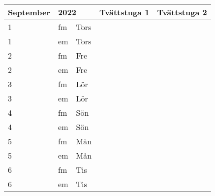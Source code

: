 \documentclass[a4paper]{article}
\begin{document}
\begin{table}[ht!]
\vspace{-10em}%
\normalsize
\begin{tabular}{lllp{7cm}p{7cm}}
\textbf{September}           & \multicolumn{2}{l}{\textbf{2022}}                  & \textbf{Tvättstuga 1} & \textbf{Tvättstuga 2} \\ \hline    

\multicolumn{1}{|l|}{1} & \multicolumn{1}{l|}{fm} & \multicolumn{1}{l|}{Tors} & \multicolumn{1}{l|}{} & \multicolumn{1}{l|}{} \\ \hline
\multicolumn{1}{|l|}{1} & \multicolumn{1}{l|}{em} & \multicolumn{1}{l|}{Tors} & \multicolumn{1}{l|}{} & \multicolumn{1}{l|}{} \\ \hline    

\multicolumn{1}{|l|}{2} & \multicolumn{1}{l|}{fm} & \multicolumn{1}{l|}{Fre} & \multicolumn{1}{l|}{} & \multicolumn{1}{l|}{} \\ \hline
\multicolumn{1}{|l|}{2} & \multicolumn{1}{l|}{em} & \multicolumn{1}{l|}{Fre} & \multicolumn{1}{l|}{} & \multicolumn{1}{l|}{} \\ \hline    

\multicolumn{1}{|l|}{3} & \multicolumn{1}{l|}{fm} & \multicolumn{1}{l|}{Lör} & \multicolumn{1}{l|}{} & \multicolumn{1}{l|}{} \\ \hline
\multicolumn{1}{|l|}{3} & \multicolumn{1}{l|}{em} & \multicolumn{1}{l|}{Lör} & \multicolumn{1}{l|}{} & \multicolumn{1}{l|}{} \\ \hline    

\multicolumn{1}{|l|}{4} & \multicolumn{1}{l|}{fm} & \multicolumn{1}{l|}{Sön} & \multicolumn{1}{l|}{} & \multicolumn{1}{l|}{} \\ \hline
\multicolumn{1}{|l|}{4} & \multicolumn{1}{l|}{em} & \multicolumn{1}{l|}{Sön} & \multicolumn{1}{l|}{} & \multicolumn{1}{l|}{} \\ \hline    

\multicolumn{1}{|l|}{5} & \multicolumn{1}{l|}{fm} & \multicolumn{1}{l|}{Mån} & \multicolumn{1}{l|}{} & \multicolumn{1}{l|}{} \\ \hline
\multicolumn{1}{|l|}{5} & \multicolumn{1}{l|}{em} & \multicolumn{1}{l|}{Mån} & \multicolumn{1}{l|}{} & \multicolumn{1}{l|}{} \\ \hline    

\multicolumn{1}{|l|}{6} & \multicolumn{1}{l|}{fm} & \multicolumn{1}{l|}{Tis} & \multicolumn{1}{l|}{} & \multicolumn{1}{l|}{} \\ \hline
\multicolumn{1}{|l|}{6} & \multicolumn{1}{l|}{em} & \multicolumn{1}{l|}{Tis} & \multicolumn{1}{l|}{} & \multicolumn{1}{l|}{} \\ \hline    


\end{tabular}
\end{table}
\end{document}
